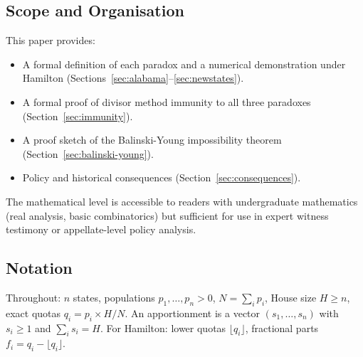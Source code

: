 \subsection{Scope and Organisation}

This paper provides:
\begin{itemize}
  \item A formal definition of each paradox and a numerical demonstration
    under Hamilton (Sections~\ref{sec:alabama}--\ref{sec:newstates}).
  \item A formal proof of divisor method immunity to all three paradoxes
    (Section~\ref{sec:immunity}).
  \item A proof sketch of the Balinski-Young impossibility theorem
    (Section~\ref{sec:balinski-young}).
  \item Policy and historical consequences (Section~\ref{sec:consequences}).
\end{itemize}
The mathematical level is accessible to readers with undergraduate
mathematics (real analysis, basic combinatorics) but sufficient for
use in expert witness testimony or appellate-level policy analysis.

\subsection{Notation}

Throughout: $n$ states, populations $p_1, \ldots, p_n > 0$,
$N = \sum_i p_i$, House size $H \geq n$,
exact quotas $q_i = p_i \times H / N$.
An apportionment is a vector $(s_1, \ldots, s_n)$ with $s_i \geq 1$
and $\sum_i s_i = H$.
For Hamilton: lower quotas $\lfloor q_i \rfloor$,
fractional parts $f_i = q_i - \lfloor q_i \rfloor$.
